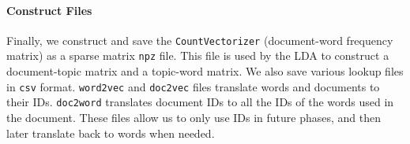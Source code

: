 \paragraph{Construct Files}
Finally, we construct and save the \texttt{CountVectorizer} (document-word frequency matrix) as a sparse matrix \texttt{npz} file.
This file is used by the LDA to construct a document-topic matrix and a topic-word matrix.
We also save various lookup files in \texttt{csv} format.
\texttt{word2vec} and \texttt{doc2vec} files translate words and documents to their IDs.
\texttt{doc2word} translates document IDs to all the IDs of the words used in the document.
These files allow us to only use IDs in future phases, and then later translate back to words when needed.



